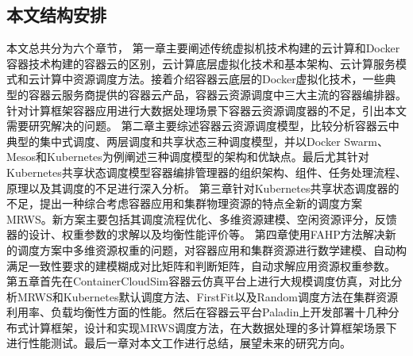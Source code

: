 \subsection{本文结构安排}
本文总共分为六个章节，
第一章主要阐述传统虚拟机技术构建的云计算和Docker容器技术构建的容器云的区别，云计算底层虚拟化技术和基本架构、云计算服务模式和云计算中资源调度方法。接着介绍容器云底层的Docker虚拟化技术，一些典型的容器云服务商提供的容器云产品，容器云资源调度中三大主流的容器编排器。针对计算框架容器应用进行大数据处理场景下容器云资源调度器的不足，引出本文需要研究解决的问题。
第二章主要综述容器云资源调度模型，比较分析容器云中典型的集中式调度、两层调度和共享状态三种调度模型，并以Docker Swarm、Mesos和Kubernetes为例阐述三种调度模型的架构和优缺点。最后尤其针对Kubernetes共享状态调度模型容器编排管理器的组织架构、组件、任务处理流程、原理以及其调度的不足进行深入分析。
第三章针对Kubernetes共享状态调度器的不足，提出一种综合考虑容器应用和集群物理资源的特点全新的调度方案MRWS。新方案主要包括其调度流程优化、多维资源建模、空闲资源评分，反馈器的设计、权重参数的求解以及均衡性能评价等。
第四章使用FAHP方法解决新的调度方案中多维资源权重的问题，对容器应用和集群资源进行数学建模、自动构满足一致性要求的建模糊成对比矩阵和判断矩阵，自动求解应用资源权重参数。
第五章首先在ContainerCloudSim容器云仿真平台上进行大规模调度仿真，对比分析MRWS和Kubernetes默认调度方法、FirstFit以及Random调度方法在集群资源利用率、负载均衡性方面的性能。然后在容器云平台Paladin上开发部署十几种分布式计算框架，设计和实现MRWS调度方法，在大数据处理的多计算框架场景下进行性能测试。最后一章对本文工作进行总结，展望未来的研究方向。

